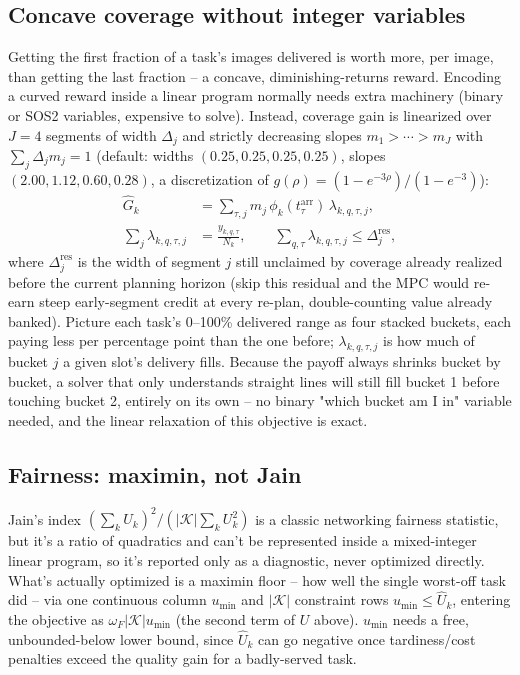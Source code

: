 \subsection{Concave coverage without integer variables}
\label{sec:coverage}

Getting the first fraction of a task's images delivered is worth more, per image, than getting the last fraction -- a concave, diminishing-returns reward. Encoding a curved reward inside a linear program normally needs extra machinery (binary or SOS2 variables, expensive to solve). Instead, coverage gain is linearized over $J{=}4$ segments of width $\Delta_j$ and strictly decreasing slopes $m_1 > \cdots > m_J$ with $\sum_j \Delta_j m_j = 1$ (default: widths $(0.25,0.25,0.25,0.25)$, slopes $(2.00, 1.12, 0.60, 0.28)$, a discretization of $g(\rho) = (1-e^{-3\rho})/(1-e^{-3})$):
\begin{align}
\hat G_k &= \sum_{\tau, j} m_j\, \phi_k(t^{\mathrm{arr}}_\tau)\,
  \lambda_{k,q,\tau,j}, \\
\sum_j \lambda_{k,q,\tau,j} &= \frac{y_{k,q,\tau}}{N_k}, \qquad
\sum_{q,\tau} \lambda_{k,q,\tau,j} \le \Delta_j^{\mathrm{res}},
\end{align}
where $\Delta_j^{\mathrm{res}}$ is the width of segment $j$ still unclaimed by coverage already realized before the current planning horizon (skip this residual and the MPC would re-earn steep early-segment credit at every re-plan, double-counting value already banked). Picture each task's 0--100\% delivered range as four stacked buckets, each paying less per percentage point than the one before; $\lambda_{k,q,\tau,j}$ is how much of bucket $j$ a given slot's delivery fills. Because the payoff always shrinks bucket by bucket, a solver that only understands straight lines will still fill bucket 1 before touching bucket 2, entirely on its own -- no binary "which bucket am I in" variable needed, and the linear relaxation of this objective is exact.

\subsection{Fairness: maximin, not Jain}

Jain's index $(\sum_k U_k)^2 / (|\mathcal{K}| \sum_k U_k^2)$ is a classic networking fairness statistic, but it's a ratio of quadratics and can't be represented inside a mixed-integer linear program, so it's reported only as a diagnostic, never optimized directly. What's actually optimized is a maximin floor -- how well the single worst-off task did -- via one continuous column $u_{\min}$ and $|\mathcal{K}|$ constraint rows $u_{\min} \le \hat U_k$, entering the objective as $\omega_F |\mathcal{K}| u_{\min}$ (the second term of $U$ above). $u_{\min}$ needs a free, unbounded-below lower bound, since $\hat U_k$ can go negative once tardiness/cost penalties exceed the quality gain for a badly-served task.

